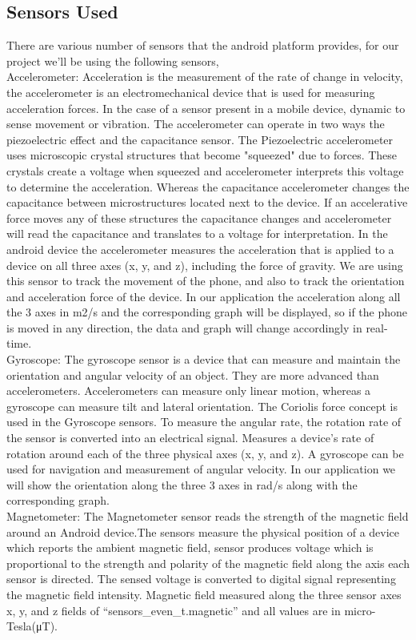 \documentclass[conference]{IEEEtran}
\begin{document}
\subsection{Sensors Used}
There are various number of sensors that the android platform provides, for our project we'll be using the following sensors,\\
Accelerometer: Acceleration is the measurement of the rate of change in velocity, the accelerometer is an electromechanical device that is used for measuring acceleration forces. In the case of a sensor present in a mobile device, dynamic to sense movement or vibration. The accelerometer can operate in two ways the piezoelectric effect and the capacitance sensor. The Piezoelectric accelerometer uses microscopic crystal structures that become "squeezed" due to forces. These crystals create a voltage when squeezed and accelerometer interprets this voltage to determine the acceleration. Whereas the capacitance accelerometer changes the capacitance between microstructures located next to the device. If an accelerative force moves any of these structures the capacitance changes and accelerometer will read the capacitance and translates to a voltage for interpretation. In the android device the accelerometer measures the acceleration that is applied to a device on all three axes (x, y, and z), including the force of gravity. We are using this sensor to track the movement of the phone, and also to track the orientation and acceleration force of the device. In our application the acceleration along all the 3 axes in m2/s and the corresponding graph will be displayed, so if the phone is moved in any direction, the data and graph will change accordingly in real-time.\\
Gyroscope: The gyroscope sensor is a device that can measure and maintain the orientation and angular velocity of an object. They are more advanced than accelerometers. Accelerometers can measure only linear motion, whereas a gyroscope can measure tilt and lateral orientation. The Coriolis force concept is used in the Gyroscope sensors. To measure the angular rate, the rotation rate of the sensor is converted into an electrical signal. Measures a device's rate of rotation around each of the three physical axes (x, y, and z). A gyroscope can be used for navigation and measurement of angular velocity. In our application we will show the orientation along the three 3 axes in rad/s along with the corresponding graph.\\
Magnetometer: The Magnetometer sensor reads the strength of the magnetic field around an Android device.The sensors measure the physical position of a device which reports the ambient magnetic  field, sensor produces  voltage which is proportional to the strength and polarity of the magnetic field along the axis each sensor is directed. The sensed voltage is converted to digital signal representing the magnetic field intensity. Magnetic field measured along the three sensor axes  x, y, and z fields of “sensors\_even\_t.magnetic” and all values are in micro-Tesla(μT).
\end{document}
